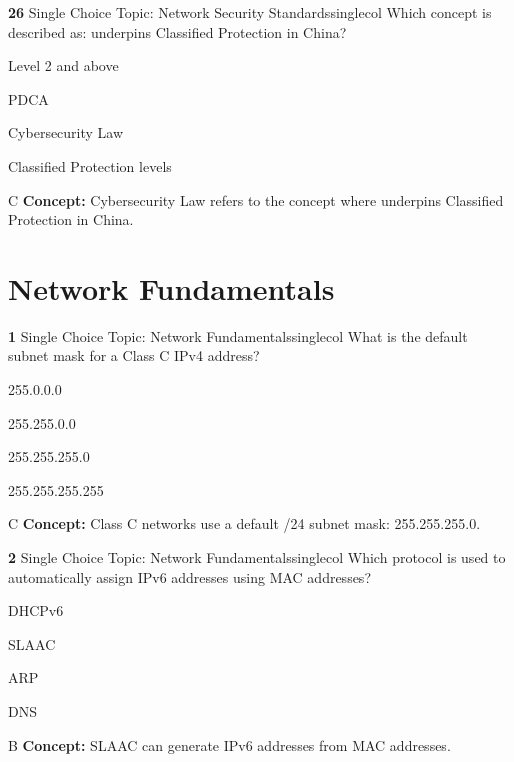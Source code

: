\documentclass[10pt,a4paper]{article}
\begin{document}
\begin{qcard}{\color{white}\textbf{26} \hfill \small Single Choice \textbar{} Topic: Network Security Standards}{singlecol}
Which concept is described as: underpins Classified Protection in China?

\begin{qoptions}
\item Level 2 and above
\item PDCA
\item Cybersecurity Law
\item Classified Protection levels
\end{qoptions}
\begin{explainbox}{C}
\textbf{Concept:} Cybersecurity Law refers to the concept where underpins Classified Protection in China.
\end{explainbox}
\end{qcard}

\section{Network Fundamentals}
\begin{qcard}{\color{white}\textbf{1} \hfill \small Single Choice \textbar{} Topic: Network Fundamentals}{singlecol}
What is the default subnet mask for a Class C IPv4 address?

\begin{qoptions}
\item 255.0.0.0
\item 255.255.0.0
\item 255.255.255.0
\item 255.255.255.255
\end{qoptions}
\begin{explainbox}{C}
\textbf{Concept:} Class C networks use a default /24 subnet mask: 255.255.255.0.
\end{explainbox}
\end{qcard}

\begin{qcard}{\color{white}\textbf{2} \hfill \small Single Choice \textbar{} Topic: Network Fundamentals}{singlecol}
Which protocol is used to automatically assign IPv6 addresses using MAC addresses?

\begin{qoptions}
\item DHCPv6
\item SLAAC
\item ARP
\item DNS
\end{qoptions}
\begin{explainbox}{B}
\textbf{Concept:} SLAAC can generate IPv6 addresses from MAC addresses.
\end{explainbox}
\end{qcard}
\end{document}
